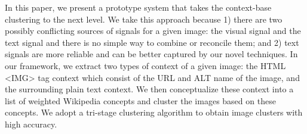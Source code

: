
%
%
%

In this paper, we present a prototype system that takes the context-base
clustering to the next level. We take this approach because 1) there are
two possibly conflicting sources of signals for a given image:
the visual signal and the text signal and there is no simple way to combine
or reconcile them; and 2) text signals are more reliable and can be better
captured by our novel techniques. In our framework,
we extract two types of context of a given image: the HTML <IMG> tag context
which consist of the URL and ALT name of the image,
and the surrounding plain text context. We then conceptualize these context
into a list of weighted Wikipedia concepts and cluster the images
based on these concepts.
%
%
We adopt a tri-stage
clustering algorithm to obtain image clusters with high accuracy.

